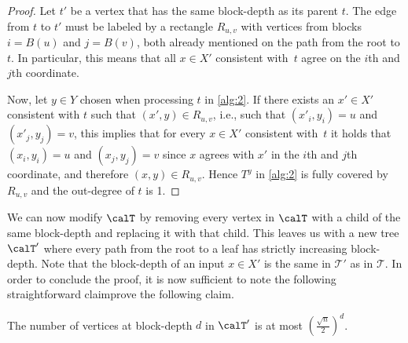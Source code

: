 {}{
    \begin{proof}
        Let $t'$ be a vertex that has the same block-depth as its parent $t$. The edge from $t$ to $t'$ must be labeled by a rectangle $R_{u,v}$ with vertices from blocks $i=B(u)$ and $j=B(v)$, both already mentioned on the path from the root to $t$. In particular, this means that all $x\in X'$ consistent with~$t$ agree on the $i$th and $j$th coordinate. 
        
        Now, let $y \in Y$ chosen when processing $t$ in \autoref{alg:2}. 
        If there exists an $x'\in X'$ consistent with $t$ such that $(x',y) \in R_{u,v}$, i.e., such that $(x'_i,y_i) = u$ and $(x'_j,y_j) = v$, this implies that for every $x\in X'$ consistent with~$t$ it holds that $(x_i,y_i) = u$ and $(x_j,y_j) = v$ since $x$ agrees with $x'$ in the  $i$th and $j$th coordinate, and therefore $(x,y) \in R_{u,v}$. Hence $T^y$ in \autoref{alg:2} is fully covered by $R_{u,v}$ and the out-degree of $t$ is 1.
    \end{proof}
}

    We can now modify $\calT$ by removing every vertex in $\calT$ with a child of the same block-depth and replacing it with that child. This leaves us with a new tree $\calT '$ where every path from the root to a leaf has strictly increasing block-depth. Note that the block-depth of an input $x\in X'$ is the same in $\mathcal{T}'$ as in $\mathcal{T}$. 
    In order to conclude the proof, it is now sufficient to 
{note the following straightforward claim}{prove the following claim}.
    
\begin{claim}
    \label{claim:size-bound}
    The number of vertices at block-depth $d$ in $\calT '$ is at most $\left(\frac{\sqrt{n}}{2}\right)^d$. 
\end{claim}


